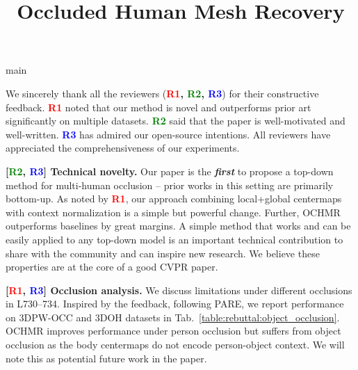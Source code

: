 main\documentclass[10pt,twocolumn,letterpaper]{article}
\newcommand{\Rone}{\textcolor{Red}{R1}}
\newcommand{\Rtwo}{\textcolor{Green}{R2}}
\newcommand{\Rthree}{\textcolor{Blue}{R3}}
\begin{document}
\title{Occluded Human Mesh Recovery}


\maketitle
\thispagestyle{empty}


\vspace*{-0.35in}
\noindent
We sincerely thank all the reviewers (\textbf{\Rone, \Rtwo, \Rthree}) for their constructive feedback. \textbf{\Rone} noted that our method is novel and outperforms prior art significantly on multiple datasets. \textbf{\Rtwo} said that the paper is well-motivated and well-written. \textbf{\Rthree} has admired our open-source intentions. All reviewers have appreciated the comprehensiveness of our experiments. 

\vspace{1.0mm}\noindent
\textbf{[\Rtwo, \Rthree] Technical novelty.} Our paper is the \textbf{\textit{first}} to propose a top-down method for multi-human occlusion -- prior works in this setting are primarily bottom-up. As noted by \textbf{\Rone}, our approach combining local+global centermaps with context normalization is a simple but powerful change. Further, {\small OCHMR} outperforms baselines by great margins. A simple method that works and can be easily applied to any top-down model is an important technical contribution to share with the community and can inspire new research. We believe these properties are at the core of a good {\small CVPR} paper.


\vspace{1.0mm}\noindent
\textbf{[\Rone, \Rthree] Occlusion analysis.} We discuss limitations under different occlusions in L730--734. Inspired by the feedback, following PARE, we report performance on 3DPW-OCC and 3DOH datasets in Tab.~\ref{table:rebuttal:object_occlusion}. OCHMR improves performance under person occlusion but suffers from object occlusion as the body centermaps do not encode person-object context. We will note this as potential future work in the paper.
\end{document}
